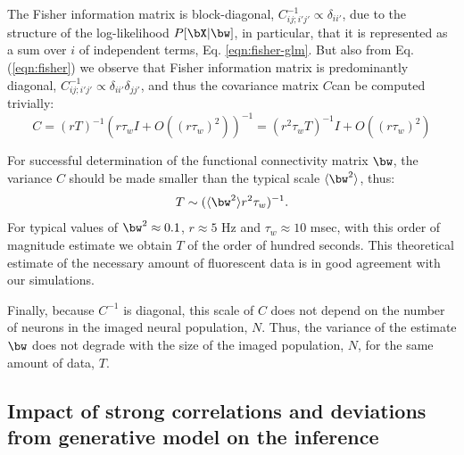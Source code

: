 The Fisher information matrix is block-diagonal, $C^{-1}_{ij;i'j'} \propto \delta_{ii'}$,
due to the structure of the log-likelihood $P[\bX | \bw]$, in particular, that it is represented as a sum over $i$ of independent terms, Eq. \ref{eqn:fisher-glm}.
But also from Eq. (\ref{eqn:fisher}) we observe that Fisher information matrix is predominantly diagonal, $C^{-1}_{ij;i'j'} \propto \delta_{ii'}\delta_{jj'}$, and thus the covariance matrix $C$can be computed trivially:
\begin{equation}
C = (rT)^{-1} (r \tau_w I + O((r \tau_w)^2))^{-1} =
(r^2 \tau_w T)^{-1} I + O((r \tau_w)^2)
\end{equation}

For successful determination of the functional connectivity matrix $\bw$, the variance $C$ should be made smaller than the typical scale $\langle \bw^2\rangle$, thus:
\begin{equation}
T \sim (\langle \bw^2 \rangle r^2  \tau_w)^{-1}.
\end{equation}
For typical values of $\bw^2\approx 0.1$, $r\approx 5$  Hz and $ \tau_w \approx 10$ msec,
with this order of magnitude estimate we obtain $T$ of the order of hundred seconds. This theoretical estimate of the necessary amount of fluorescent data is in good agreement with our simulations.

Finally, because $C^{-1}$ is diagonal, this scale of $C$ does not depend on the number of neurons in the imaged neural population, $N$. Thus, the variance of the estimate $\bw$ does not degrade with the size of the imaged population, $N$, for the same amount of data, $T$.

\subsection{Impact of strong correlations and deviations from generative model on the inference}

